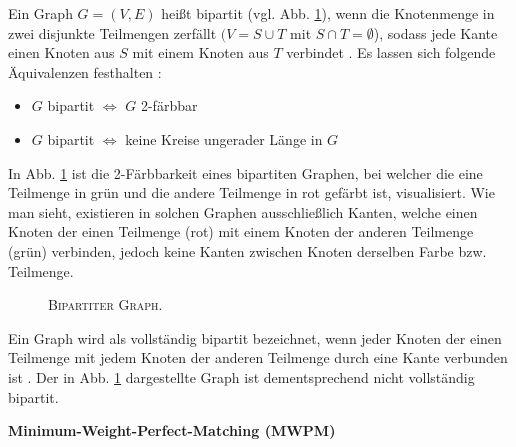 Ein Graph $G = (V, E)$ heißt bipartit (vgl. Abb. \ref{fig:digression_bipartite_graph}), wenn die Knotenmenge in zwei disjunkte Teilmengen zerfällt
$(V = S \cup T$ mit $S \cap T = \emptyset$), sodass jede Kante einen Knoten aus $S$ mit einem Knoten aus $T$ verbindet \cite{HochschuleDarmstadt}.\newline
Es lassen sich folgende Äquivalenzen festhalten \cite{Leighton2010}:
\begin{itemize}
  \item $G$ bipartit $\iff$ $G$ 2-färbbar
  \item $G$ bipartit $\iff$ keine Kreise ungerader Länge in $G$
\end{itemize}
In Abb. \ref{fig:digression_bipartite_graph} ist die 2-Färbbarkeit eines bipartiten Graphen, bei welcher die eine Teilmenge
in grün und die andere Teilmenge in rot gefärbt ist, visualisiert. Wie man sieht, existieren in solchen Graphen
ausschließlich Kanten, welche einen Knoten der einen Teilmenge (rot) mit einem Knoten der anderen Teilmenge (grün) verbinden,
jedoch keine Kanten zwischen Knoten derselben Farbe bzw. Teilmenge.

\begin{figure}[H]
\centering
{}
\caption{\textsc{Bipartiter Graph.}}
\label{fig:digression_bipartite_graph}
\end{figure}

\vfill
\pagebreak

Ein Graph wird als vollständig bipartit bezeichnet, wenn jeder Knoten der einen Teilmenge mit jedem Knoten
der anderen Teilmenge durch eine Kante verbunden ist \cite{Knust2019}. Der in Abb. \ref{fig:digression_bipartite_graph}
dargestellte Graph ist dementsprechend nicht vollständig bipartit.\newline

\textbf{Minimum-Weight-Perfect-Matching (\textsc{MWPM})}

